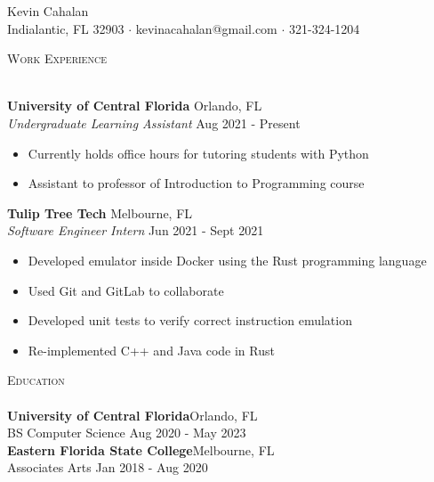 \documentclass[a4paper]{article}
\newcommand{\lineunder} {
	\vspace*{-8pt} \\
	\hspace*{-18pt} \hrulefill \\
}
\newcommand{\header} [1] {
	{\hspace*{-18pt}\vspace*{6pt} \textsc{#1}}
	\vspace*{-6pt} \lineunder
}
\begin{document}
	\vspace*{-40pt}

		

	\vspace*{-10pt}
	\begin{flushleft}
		{\Huge{Kevin Cahalan}}\\
		Indialantic, FL 32903 $\cdot$ kevinacahalan@gmail.com $\cdot$ 321-324-1204\\
	\end{flushleft}


	\header{Work Experience}
	\vspace{1mm}

	\textbf{University of Central Florida} \hfill Orlando, FL\\
	\textit{Undergraduate Learning Assistant} \hfill Aug 2021 - Present\\
	\vspace{-1mm}
	\begin{itemize} \itemsep -3pt
		\item Currently holds office hours for tutoring students with Python
		\item Assistant to professor of Introduction to Programming course
	\end{itemize}
	\textbf{Tulip Tree Tech} \hfill Melbourne, FL\\
	\textit{Software Engineer Intern} \hfill Jun 2021 - Sept 2021\\
	\vspace{-1mm}
	\begin{itemize} \itemsep -3pt
		\item Developed emulator inside Docker using the Rust programming language
		\item Used Git and GitLab to collaborate
		\item Developed unit tests to verify correct instruction emulation
		\item Re-implemented C++ and Java code in Rust
	\end{itemize}




	\header{Education}
	\textbf{University of Central Florida}\hfill Orlando, FL\\
	BS Computer Science  \hfill Aug 2020 - May 2023\\
	\vspace{2mm}
	\textbf{Eastern Florida State College}\hfill Melbourne, FL\\
	Associates Arts  \hfill Jan 2018 - Aug 2020\\
	\vspace{2mm}
\end{document}
